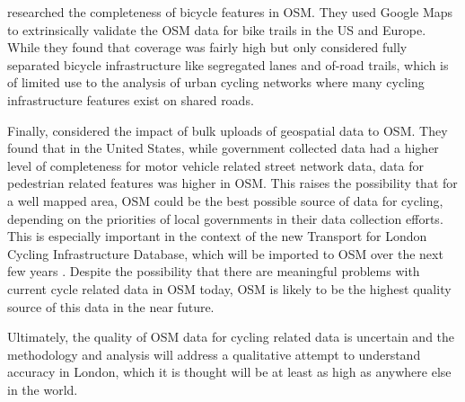\textcite{hochmair2013assessing} researched the completeness of bicycle features in OSM. They used Google Maps to extrinsically validate the OSM data for bike trails in the US and Europe. While they found that coverage was fairly high but only considered fully separated bicycle infrastructure like segregated lanes and of-road trails, which is of limited use to the analysis of urban cycling networks where many cycling infrastructure features exist on shared roads. 

Finally, \textcite{zielstra2013assessing} considered the impact of bulk uploads of geospatial data to OSM. They found that in the United States, while government collected data had a higher level of completeness for motor vehicle related street network data, data for pedestrian related features was higher in OSM. This raises the possibility that for a well mapped area, OSM could be the best possible source of data for cycling, depending on the priorities of local governments in their data collection efforts. This is especially important in the context of the new Transport for London Cycling Infrastructure Database, which will be imported to OSM over the next few years \textcite{tflcid}. Despite the possibility that there are meaningful problems with current cycle related data in OSM today, OSM is likely to be the highest quality source of this data in the near future. 

Ultimately, the quality of OSM data for cycling related data is uncertain and the methodology and analysis will address a qualitative attempt to understand accuracy in London, which it is thought will be at least as high as anywhere else in the world. 
